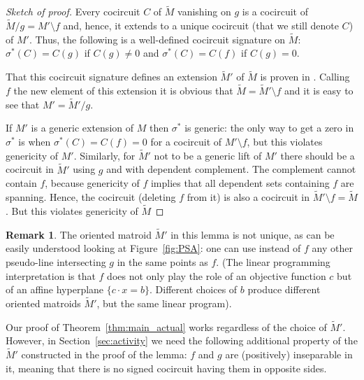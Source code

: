 \documentclass[12pt]{amsart}
\numberwithin{equation}{section}
\theoremstyle{definition}
\newtheorem{remark}[theorem]{Remark}
\newcommand{\paco}[1]{\todo[color=orange!30]{\footnotesize \rm #1 \\ \hfill --- P.}}
\begin{document}
\begin{proof}[Sketch of proof]
Every cocircuit $C$ of $\widetilde M$ vanishing on $g$ is a cocircuit of $\widetilde M/g =M'\setminus f$ and, hence, it extends to a unique cocircuit (that we still denote $C$) of $M'$. Thus, the following is a well-defined  cocircuit signature on $\widetilde M$: $\sigma^*(C) = C(g)$ if $C(g) \ne 0$ and $\sigma^*(C) = C(f)$ if $C(g) = 0$. 

That this cocircuit signature defines an extension $\widetilde M'$ of $\widetilde M$ is proven in \cite[Lemma 1.10]{Santos_book}. Calling $f$ the new element of this extension it is obvious that $\widetilde{M}=\widetilde{M}'\setminus f$ and it is easy to see that $M'=\widetilde{M}'/g$.

If $M'$ is a generic extension of $M$ then $\sigma^*$ is generic:  the only way to get a zero in $\sigma^*$ is when $\sigma^*(C) =C(f) =0$ for a cocircuit of $M'\setminus f$, but this violates genericity of $M'$.
%
Similarly, for $\widetilde M'$ not to be a generic lift of $M'$ there should be a cocircuit in $\widetilde M'$ using $g$ and with dependent complement. The complement cannot contain $f$, because genericity of $f$ implies that all dependent sets containing $f$ are spanning. Hence, the cocircuit (deleting $f$ from it) is also a cocircuit in $\widetilde M'\setminus f =\widetilde M$. But this violates genericity of $\widetilde M$
\end{proof}

\begin{remark}
    \label{rem:inseparable}
The oriented matroid $\widetilde M'$ in this lemma is not unique, as can be easily understood looking at Figure~\ref{fig:PSA}: one can use instead of $f$ any other pseudo-line intersecting $g$ in the same points as $f$. (The linear programming  
interpretation is that $f$ does not only play the role of an objective function $c$ but of an affine hyperplane $\{c\cdot x = b\}$. Different choices of $b$ produce different oriented matroids $\widetilde M'$, but the same linear program).

Our proof of Theorem~\ref{thm:main_actual} works regardless of the choice of $\widetilde M'$. However, in Section~\ref{sec:activity} we need the following additional property of the $\widetilde M'$ constructed in the proof of the lemma: $f$ and $g$ are (positively) inseparable in it, meaning that there is no signed cocircuit having them in opposite sides.
\end{remark}
\end{document}
